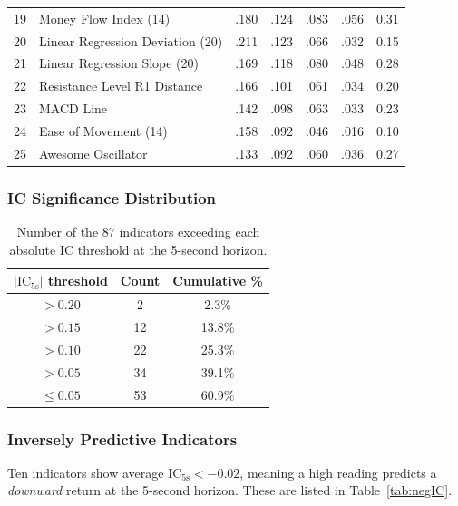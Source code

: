 \documentclass[12pt,a4paper]{article}
\theoremstyle{definition}
\theoremstyle{remark}
\newcommand{\IC}{\mathrm{IC}}
\begin{document}
\begin{table}[H]
\begin{tabular}{clrrrrc}
19 & Money Flow Index (14)           & .180 & .124 & .083 & .056 & 0.31 \\
20 & Linear Regression Deviation (20) & .211 & .123 & .066 & .032 & 0.15 \\
21 & Linear Regression Slope (20)     & .169 & .118 & .080 & .048 & 0.28 \\
22 & Resistance Level R1 Distance          & .166 & .101 & .061 & .034 & 0.20 \\
23 & MACD Line        & .142 & .098 & .063 & .033 & 0.23 \\
24 & Ease of Movement (14)    & .158 & .092 & .046 & .016 & 0.10 \\
25 & Awesome Oscillator      & .133 & .092 & .060 & .036 & 0.27 \\
\bottomrule
\end{tabular}
\end{table}

\subsubsection{IC Significance Distribution}

\begin{table}[H]
\centering
\caption{Number of the 87 indicators exceeding each absolute
  IC threshold at the 5-second horizon.}
\label{tab:icsig}
\begin{tabular}{ccc}
\toprule
$|\IC_{5\text{s}}|$ threshold & Count & Cumulative \% \\
\midrule
$> 0.20$ &  2 &  2.3\% \\
$> 0.15$ & 12 & 13.8\% \\
$> 0.10$ & 22 & 25.3\% \\
$> 0.05$ & 34 & 39.1\% \\
$\leq 0.05$ & 53 & 60.9\% \\
\bottomrule
\end{tabular}
\end{table}

\subsubsection{Inversely Predictive Indicators}

Ten indicators show average $\IC_{5\text{s}} < -0.02$, meaning a high
reading predicts a \emph{downward} return at the 5-second horizon.
These are listed in Table~\ref{tab:negIC}.
\end{document}
